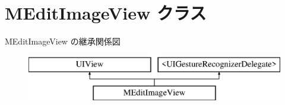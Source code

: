 \hypertarget{interface_m_edit_image_view}{}\section{M\+Edit\+Image\+View クラス}
\label{interface_m_edit_image_view}
M\+Edit\+Image\+View の継承関係図\begin{figure}[H]
\begin{center}
\leavevmode
\includegraphics[height=2.000000cm]{interface_m_edit_image_view}
\end{center}
\end{figure}
